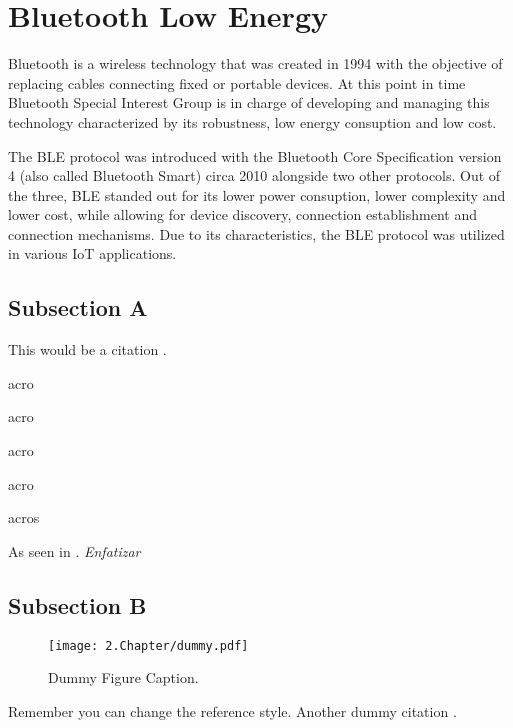 \section{Bluetooth Low Energy}
\label{sec:BLE}

Bluetooth is a wireless technology that was created in 1994 with the objective of replacing cables connecting fixed or portable devices. At this point in time Bluetooth Special Interest Group is in charge of developing and managing this technology characterized by its robustness, low energy consuption and low cost. 

The \ac{BLE} protocol was introduced with the Bluetooth Core Specification version 4 (also called Bluetooth Smart) circa 2010 alongside two other protocols.  Out of the three, \ac{BLE} standed out for its lower power consuption, lower complexity and lower cost, while allowing for  device discovery, connection establishment and connection mechanisms. Due to its characteristics, the \ac{BLE} protocol was utilized in various \ac{IoT} applications.  

\subsection{Subsection A}
\label{subsec:subasectionA}

This would be a citation \cite{dummy}.

\ac{acro} 

\acf{acro}

\acs{acro}

\acl{acro}

\acp{acro}

As seen in \cite{wiki}. \emph{Enfatizar}

\subsection{Subsection B}
\label{subsec:subbsectiona}

\begin{figure}[H]
	\centering
		\texttt{[image: 2.Chapter/dummy.pdf]}
	\caption[Dummy Figure Caption for List of Figures.]{Dummy Figure Caption.}
	\label{fig:dummyfigure1}
\end{figure}

Remember you can change the reference style. Another dummy citation \cite{site}.